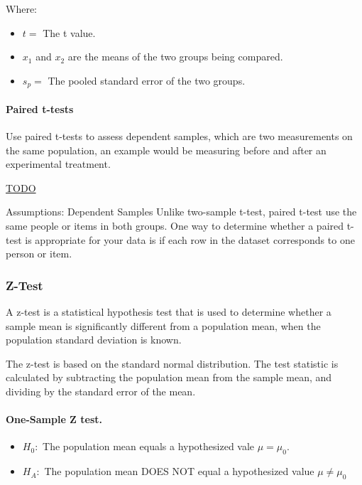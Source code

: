 \documentclass[11pt]{article}
\providecommand{\tightlist}{%
      \setlength{\itemsep}{0pt}\setlength{\parskip}{0pt}}
\begin{document}
Where:
\begin{itemize}
  \item \(t = \) The t value. 
  \item \(x_1\) and \(x_2\) are the means of the two groups being compared. 
  \item \(s_p = \) The pooled standard error of the two groups. 
\end{itemize}

\hypertarget{paired-t-tests}{%
\paragraph{Paired t-tests}\label{paired-t-tests}}

Use paired t-tests to assess dependent samples, which are two
measurements on the same population, an example would be measuring 
before and after an experimental treatment.

\href{https://libguides.library.kent.edu/spss/pairedsamplesttest}{TODO}

Assumptions: Dependent Samples Unlike two-sample t-test,
paired t-test use the same people or items in both groups. One way to
determine whether a paired t-test is appropriate for your data is if
each row in the dataset corresponds to one person or item.



\hypertarget{z-test}{%
\subsubsection{Z-Test}\label{z-test}}

A z-test is a statistical hypothesis test that is used to determine
whether a sample mean is significantly different from a population mean,
when the population standard deviation is known.

The z-test is based on the standard normal distribution. The test
statistic is calculated by subtracting the population mean from the
sample mean, and dividing by the standard error of the mean.

\hypertarget{one-sample-z-test.}{%
\paragraph{One-Sample Z test.}\label{one-sample-z-test.}}

\begin{itemize}
\tightlist
\item
  \(H_0:\) The population mean equals a hypothesized vale
  \(\mu = \mu_0\).
\item
  \(H_A:\) The population mean DOES NOT equal a hypothesized value
  \(\mu \neq  \mu_0\)
\end{itemize}
\end{document}
